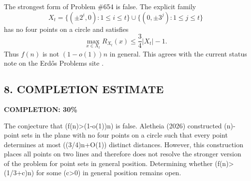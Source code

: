 The strongest form of Problem \#654 is false.  The explicit family
\[
X_t=\{(\pm 2^i,0):1\le i\le t\}\cup\{(0,\pm 3^j):1\le j\le t\}
\]
has no four points on a circle and satisfies
\[
\max_{x\in X_t}R_{X_t}(x)\le \frac{3}{4}|X_t|-1.
\]
Thus $f(n)$ is not $(1-o(1))n$ in general.  This agrees with the current status note on the Erd\H{o}s Problems site \cite{EP654}.

\subsection*{8. COMPLETION ESTIMATE}

\textbf{COMPLETION: 30\%}

The conjecture that (f(n)>(1-o(1))n) is false. Aletheia (2026) constructed (n)-point sets in the plane with no four points on a circle such that every point determines at most ((3/4)n+O(1)) distinct distances. However, this construction places all points on two lines and therefore does not resolve the stronger version of the problem for point sets in general position. Determining whether (f(n)>(1/3+c)n) for some (c>0) in general position remains open.

